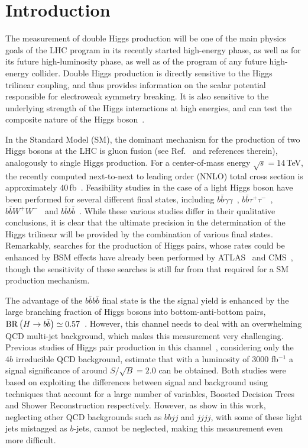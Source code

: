 \section{Introduction}

The measurement of double Higgs production will be one of the main
physics goals of the LHC program in its recently started high-energy
phase, as well as for its future high-luminosity phase, as
well as of the program of any future high-energy collider.
%
Double Higgs production is directly sensitive to the Higgs trilinear coupling, and thus 
provides information on the scalar potential responsible for electroweak symmetry breaking.
%
It is also sensitive to the underlying strength of the Higgs interactions
at high energies, and can test the composite nature of the 
Higgs boson~\cite{Giudice:2007fh,Contino:2010mh}.

In the Standard Model (SM), the dominant mechanism for the production of two Higgs bosons at the LHC is 
gluon fusion (see Ref.~\cite{baglio} and references therein), analogously to single Higgs production.
For a center-of-mass energy $\sqrt{s} = 14\,$TeV, the recently computed next-to-next to
leading order (NNLO)
total cross section is approximately $40\,$fb~\cite{deFlorian:2013jea}.
%
Feasibility studies in the case of a light Higgs boson have been performed for several different final states, including
$b\bar b\gamma\gamma$~\cite{Baur:2003gp,Barger:2013jfa},
$b\bar{b}\tau^+\tau^-$~\cite{Baur:2003gpa,Barr:2013tda,Dolan:2012rv,Dolan:2013rja},
$b\bar{b}W^+W^-$~\cite{Dolan:2012rv,Papaefstathiou:2012qe} and
$b\bar{b}b\bar{b}$~\cite{Baur:2003gpa,Dolan:2012rv,Gouzevitch:2013qca,Cooper:2013kia,Wardrope:2014kya,deLima:2014dta}.
%
While these various studies differ in their qualitative conclusions, it is clear
that the ultimate precision in the determination of the Higgs trilinear
will be provided by the combination of various final states.
%
Remarkably, searches for the production of Higgs pairs, whose rates
could be enhanced by BSM effects have already been performed
by ATLAS~\cite{Aad:2015uka} and CMS~\cite{Khachatryan:2015yea},
though the sensitivity of these searches is still far from
that required for a SM production mechanism.

The advantage of the $b\bar{b}b\bar{b}$ final state is the the signal yield
is enhanced by the large branching fraction of Higgs bosons into bottom-anti-bottom
pairs, ${\rm BR}\left( H\to b\bar{b}\right)\simeq 0.57$~\cite{Dittmaier:2012vm}.
%
However, this channel needs to deal with an overwhelming QCD multi-jet background,
which makes this measurement very challenging.
%
Previous studies of Higgs pair production in this
channel~\cite{Wardrope:2014kya,deLima:2014dta}, considering
only the $4b$ irreducible QCD background, estimate that with a luminosity of
3000 fb$^{-1}$ a signal significance of around $S/\sqrt{B}=2.0$ can be obtained.
%
Both studies were based on exploiting the differences between signal and background
using techniques that account for a large number of variables, Boosted Decision Trees
and Shower Reconstruction respectively.
%
However, as show in this work, neglecting other QCD backgrounds such as $bbjj$ and
$jjjj$, with some of these light jets mistagged as $b$-jets, cannot be neglected, making
this measurement even more difficult.

